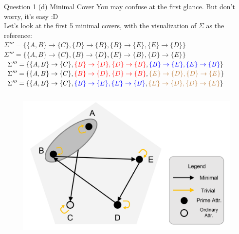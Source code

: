 \begin{frame}[fragile]{Question 1 (d) Minimal Cover}
	You may confuse at the first glance. But don't worry, it's easy :D\\\vspace{2pt}
	Let's look at the first 5 minimal covers, with the visualization of $\Sigma$ as the reference:\\\vspace{3pt}
	{\footnotesize
		$\Sigma'''=\{\{A, B\} \rightarrow \{C\}, \{D\} \rightarrow \{B\}, \{B\} \rightarrow \{E\}, \{E\} \rightarrow \{D\}\}$ \\\vspace{2pt}
		$\Sigma'''=\{\{A, B\} \rightarrow \{C\}, \{B\} \rightarrow \{D\}, \{E\} \rightarrow \{B\}, \{D\} \rightarrow \{E\}\}$ \\\vspace{4pt}
		$\Sigma'''=\{\{A, B\} \rightarrow \{C\}, \textcolor{red}{\{B\} \rightarrow \{D\}, \{D\} \rightarrow \{B\}}, \textcolor{blue}{\{B\} \rightarrow \{E\}, \{E\} \rightarrow \{B\}}\}$ \\\vspace{2pt}
		$\Sigma'''=\{\{A, B\} \rightarrow \{C\}, \textcolor{red}{\{B\} \rightarrow \{D\}, \{D\} \rightarrow \{B\}}, \textcolor{brown}{\{E\} \rightarrow \{D\}, \{D\} \rightarrow \{E\}}\}$ \\\vspace{2pt}
		$\Sigma'''=\{\{A, B\} \rightarrow \{C\}, \textcolor{blue}{\{B\} \rightarrow \{E\}, \{E\} \rightarrow \{B\}}, \textcolor{brown}{\{E\} \rightarrow \{D\}, \{D\} \rightarrow \{E\}}\}$ \\\vspace{2pt}
	}
	\vspace{5pt}
	\begin{columns}[t]
	\begin{figure}
		\includegraphics[width=1\textwidth, trim=0 0 0 0, clip]{4221-t3/images/q1.png}
	\end{figure}


\end{columns}
\end{frame}

